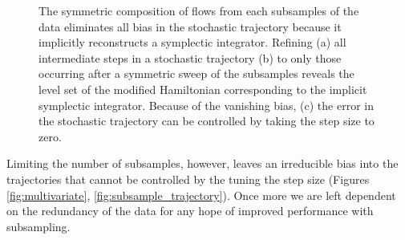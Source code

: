 \documentclass{article}
\begin{document}
\begin{figure}
\centering
{}
\caption{The symmetric composition of flows from each subsamples of the data 
eliminates all bias in the stochastic trajectory because it implicitly reconstructs a 
symplectic integrator.  Refining (a) all intermediate steps in a stochastic trajectory 
(b) to only those occurring after a symmetric sweep of the subsamples reveals
the level set of the modified Hamiltonian corresponding to the implicit
symplectic integrator.  Because of the vanishing bias, (c) the error in the
stochastic trajectory can be controlled by taking the step size to zero. }
\label{fig:symmetric_stochastic}
\end{figure}

Limiting the number of subsamples, however, leaves an irreducible bias
into the trajectories that cannot be controlled by the tuning the step size
(Figures \ref{fig:multivariate}, \ref{fig:subsample_trajectory}).  Once more 
we are left dependent on the redundancy of the data for any hope of improved 
performance with subsampling.
\end{document}
